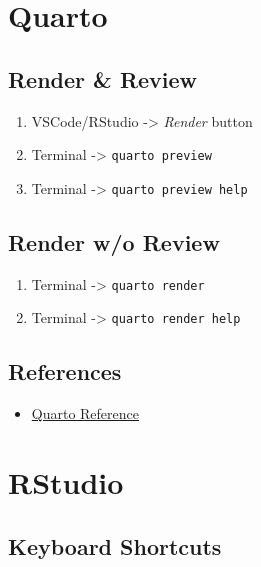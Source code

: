 \documentclass[
  letterpaper,
  DIV=11,
  numbers=noendperiod]{scrreprt}
\providecommand{\tightlist}{%
  \setlength{\itemsep}{0pt}\setlength{\parskip}{0pt}}\usepackage{longtable,booktabs,array}
\begin{document}
\chapter{Quarto}\label{quarto}

\section{Render \& Review}\label{render-review}

\begin{enumerate}
\def\labelenumi{\arabic{enumi}.}
\tightlist
\item
  VSCode/RStudio -\textgreater{} \emph{Render} button
\item
  Terminal -\textgreater{} \texttt{quarto\ preview}
\item
  Terminal -\textgreater{} \texttt{quarto\ preview\ help}
\end{enumerate}

\section{Render w/o Review}\label{render-wo-review}

\begin{enumerate}
\def\labelenumi{\arabic{enumi}.}
\tightlist
\item
  Terminal -\textgreater{} \texttt{quarto\ render}
\item
  Terminal -\textgreater{} \texttt{quarto\ render\ help}
\end{enumerate}

\section{References}\label{references-1}

\begin{itemize}
\tightlist
\item
  \href{https://quarto.org/docs/reference/}{Quarto Reference}
\end{itemize}

\chapter{RStudio}\label{rstudio}

\section{Keyboard Shortcuts}\label{keyboard-shortcuts}
\end{document}
